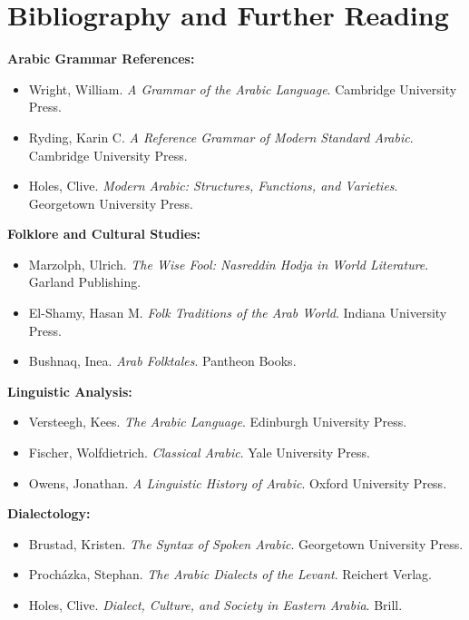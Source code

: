 \documentclass[letter,12pt]{article}
\begin{document}
\section{Bibliography and Further Reading}

\begin{tcolorbox}[colback=white,colframe=headercolor,title=\textbf{Recommended Sources},breakable]
\textbf{Arabic Grammar References:}
\begin{itemize}
\item Wright, William. \textit{A Grammar of the Arabic Language}. Cambridge University Press.
\item Ryding, Karin C. \textit{A Reference Grammar of Modern Standard Arabic}. Cambridge University Press.
\item Holes, Clive. \textit{Modern Arabic: Structures, Functions, and Varieties}. Georgetown University Press.
\end{itemize}

\textbf{Folklore and Cultural Studies:}
\begin{itemize}
\item Marzolph, Ulrich. \textit{The Wise Fool: Nasreddin Hodja in World Literature}. Garland Publishing.
\item El-Shamy, Hasan M. \textit{Folk Traditions of the Arab World}. Indiana University Press.
\item Bushnaq, Inea. \textit{Arab Folktales}. Pantheon Books.
\end{itemize}

\textbf{Linguistic Analysis:}
\begin{itemize}
\item Versteegh, Kees. \textit{The Arabic Language}. Edinburgh University Press.
\item Fischer, Wolfdietrich. \textit{Classical Arabic}. Yale University Press.
\item Owens, Jonathan. \textit{A Linguistic History of Arabic}. Oxford University Press.
\end{itemize}

\textbf{Dialectology:}
\begin{itemize}
\item Brustad, Kristen. \textit{The Syntax of Spoken Arabic}. Georgetown University Press.
\item Procházka, Stephan. \textit{The Arabic Dialects of the Levant}. Reichert Verlag.
\item Holes, Clive. \textit{Dialect, Culture, and Society in Eastern Arabia}. Brill.
\end{itemize}
\end{tcolorbox}
\end{document}
